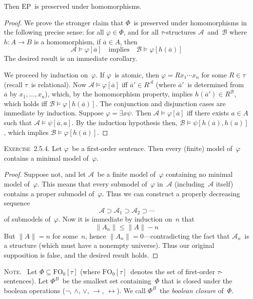 \documentclass[letterpaper]{article}
\newcommand{\A}{\mathcal{A}}
\newcommand{\B}{\mathcal{B}}
\newcommand{\fo}{\mathrm{FO}}
\newcommand{\ep}{\mathrm{EP}}
\newcommand{\obar}[1]{\overline{#1}}
\newcommand{\limp}{\rightarrow}
\newcommand{\liff}{\leftrightarrow}
\newcommand{\card}[1]{\|{#1}\|}
\newcommand{\exercise}[1]{\noindent\textsc{Exercise~{#1}.}}
\newcommand{\note}{\noindent\textsc{Note.}\ }
\theoremstyle{plain}
\begin{document}
Then $\ep$~is preserved under homomorphisms.
\begin{proof}
We prove the stronger claim that $\Phi$~is preserved under homomorphisms in the following precise sense: for all $\varphi\in\Phi$, and for all $\tau$-structures $\A$~and~$\B$ where $h:A\to B$ is a homomorphism, if $\obar{a}\in A$, then
$$\A\models\varphi[\obar{a}]\quad\text{implies}\quad\B\models\varphi[h(\obar{a})]$$
The desired result is an immediate corollary.

We proceed by induction on~$\varphi$. If $\varphi$~is atomic, then $\varphi=Rx_1\cdots x_n$ for some $R\in\tau$ (recall $\tau$~is relational). Now $\A\models\varphi[\obar{a}]$ iff $\obar{a}'\in R^{\A}$ (where $\obar{a}'$~is determined from~$\obar{a}$ by $x_1,\ldots,x_n$), which, by the homomorphism property, implies $h(\obar{a}')\in R^{\B}$, which holds iff $\B\models\varphi[h(\obar{a})]$. The conjunction and disjunction cases are immediate by induction. Suppose $\varphi=\exists x\psi$. Then $\A\models\varphi[\obar{a}]$ iff there exists $a\in A$ such that $\A\models\psi[\obar{a},a]$. By the induction hypothesis then, $\B\models\psi[h(\obar{a}),h(a)]$, which implies $\B\models\varphi[h(\obar{a})]$.
\end{proof}

\exercise{2.5.4}
Let $\varphi$~be a first-order sentence. Then every (finite) model of~$\varphi$ contains a minimal model of~$\varphi$.
\begin{proof}
Suppose not, and let $\A$~be a finite model of~$\varphi$ containing no minimal model of~$\varphi$. This means that every submodel of~$\varphi$ in~$\A$ (including~$\A$ itself) contains a proper submodel of~$\varphi$. Thus we can construct a properly decreasing sequence
$$\A\supset\A_1\supset\A_2\supset\cdots$$
of submodels of~$\varphi$. Now it is immediate by induction on~$n$ that
$$\card{A_n}\le\card{A}-n$$
But $\card{A}=n$ for some~$n$, hence $\card{A_n}=0$---contradicting the fact that $\A_n$~is a structure (which must have a nonempty universe). Thus our original supposition is false, and the desired result holds.
\end{proof}

\note
Let $\Phi\subseteq\fo_0[\tau]$ (where $\fo_0[\tau]$~denotes the set of first-order $\tau$-sentences). Let $\Phi^B$~be the smallest set containing~$\Phi$ that is closed under the boolean operations ($\lnot$, $\land$, $\lor$, $\limp$, $\liff$). We call $\Phi^B$~the \emph{boolean closure} of~$\Phi$.
\end{document}
